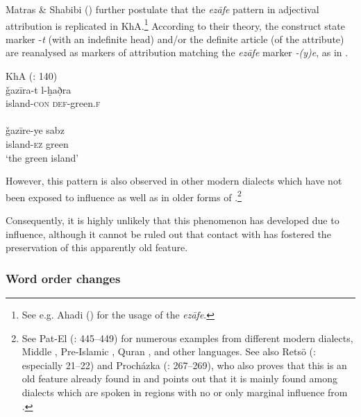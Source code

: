 \documentclass[output=paper,nonflat]{langsci/langscibook}
\begin{document}
Matras \& Shabibi (\citeyear[140]{MatrasShabibi2007}) further postulate that the  \textit{ezāfe} pattern in adjectival attribution is replicated in KhA.\footnote{See e.g. Ahadi (\citeyear[103–109]{Ahadi2001}) for the usage of the  \textit{ezāfe}.} According to their theory, the construct state marker -\textit{t} (with an indefinite head) and/or the {definite} {article} (of the attribute) are reanalysed as markers of attribution matching the   \textit{ezāfe} marker \textit{-(y)e}, as in . 

\ea\label{island}
\ea
{KhA (\citealt{MatrasShabibi2007}: 140)}\\
\gll ǧazīra-t l-ḫað̣ra \\
     island-\textsc{con} \textsc{def}-green.\textsc{f}\\
 
\\
\gll ǧazīre-ye sabz\\
     island-\textsc{ez} green\\
\glt ‘the green island’ 
\z\z

However, this pattern is also observed in other modern  dialects which have not been exposed to  influence as well as in older forms of .\footnote{See Pat-El (\citeyear{Pat-El2017}: 445–449) for numerous examples from different modern  dialects, Middle , Pre-Islamic , {Quran} , and other   languages. See also Retsö (\citeyear{Retsö2009}: especially 21–22) and Procházka (\citeyear{Procházka2018Fertile}: 267–269), who also proves that this is an old feature already found in   and points out that it is mainly found among dialects which are spoken in regions with no or only marginal influence from  .} 

Consequently, it is highly unlikely that this phenomenon has developed due to  influence, although it cannot be ruled out that contact with  has fostered the preservation of this apparently old feature. 


\subsubsection{Word order changes} \label{woc}
\end{document}
